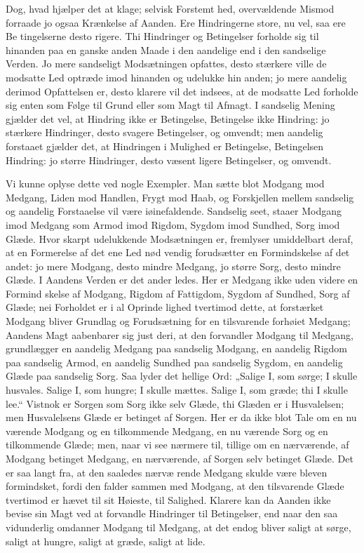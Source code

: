 \documentclass[12pt]{book}
\newcommand{\opage}[1]{\marginnote{\footnotesize\textit{[#1]}}}
\begin{document}
Dog, hvad hjælper det at klage; selvisk Forstemt\-%
hed, overvældende Mismod forraade jo ogsaa Krænkelse
af Aanden. Ere Hindringerne store, nu vel, saa ere Be\-%
tingelserne desto rigere. Thi Hindringer og Betingelser
forholde sig til hinanden paa en ganske anden Maade i
den aandelige end i den sandselige Verden. Jo mere
sandseligt Modsætningen opfattes, desto stærkere ville de
modsatte Led optræde imod hinanden og udelukke hin\-%
anden; jo mere aandelig derimod Opfattelsen er, desto
klarere vil det indsees, at de modsatte Led forholde sig enten
som Følge til Grund eller som Magt til Afmagt. I sandselig
Mening gjælder det vel, at Hindring ikke er Betingelse,
Betingelse ikke Hindring: jo stærkere Hindringer, desto
svagere Betingelser, og omvendt; men aandelig forstaaet
gjælder det, at Hindringen i Mulighed er Betingelse,
Betingelsen Hindring: jo større Hindringer, desto væsent\-%
ligere Betingelser, og omvendt.

Vi kunne oplyse dette ved nogle Exempler. Man
sætte blot Modgang mod Medgang, Liden mod Handlen,
Frygt mod Haab, og Forskjellen mellem sandselig og
aandelig Forstaaelse vil være iøinefaldende. Sandselig
seet, staaer Modgang imod Medgang som Armod imod
Rigdom, Sygdom imod Sundhed, Sorg imod Glæde.
Hvor skarpt udelukkende Modsætningen er, fremlyser
umiddelbart deraf, at en Formerelse af det ene Led nød\-%
vendig forudsætter en Formindskelse af det andet: jo
mere Modgang, desto mindre Medgang, jo større Sorg,
\opage{7}\setcounter{footnote}{0}%
desto mindre Glæde. I Aandens Verden er det ander\-%
ledes. Her er Medgang ikke uden videre en Formind\-%
skelse af Modgang, Rigdom af Fattigdom, Sygdom af
Sundhed, Sorg af Glæde; nei Forholdet er i al Oprinde\-%
lighed tvertimod dette, at forstærket Modgang bliver
Grundlag og Forudsætning for en tilsvarende forhøiet
Medgang; Aandens Magt aabenbarer sig just deri, at
den forvandler Modgang til Medgang, grundlægger en
aandelig Medgang paa sandselig Modgang, en aandelig
Rigdom paa sandselig Armod, en aandelig Sundhed paa
sandselig Sygdom, en aandelig Glæde paa sandselig Sorg.
Saa lyder det hellige Ord: „Salige I, som sørge; I
skulle husvales. Salige I, som hungre; I skulle mættes.
Salige I, som græde; thi I skulle lee.“ Vistnok er
Sorgen som Sorg ikke selv Glæde, thi Glæden er i
Husvalelsen; men Husvalelsens Glæde er betinget af
Sorgen. Her er da ikke blot Tale om en nu\-%
værende Modgang og en tilkommende Medgang, en nu\-%
værende Sorg og en tilkommende Glæde; men, naar vi
see nærmere til, tillige om en nærværende, af Modgang
betinget Medgang, en nærværende, af Sorgen selv betinget
Glæde. Det er saa langt fra, at den saaledes nærvæ\-%
rende Medgang skulde være bleven formindsket, fordi
den falder sammen med Modgang, at den tilsvarende
Glæde tvertimod er hævet til sit Høieste, til Salighed.
Klarere kan da Aanden ikke bevise sin Magt ved at
forvandle Hindringer til Betingelser, end naar den saa
vidunderlig omdanner Modgang til Medgang, at det endog
bliver saligt at sørge, saligt at hungre, saligt at græde,
saligt at lide.
\end{document}

